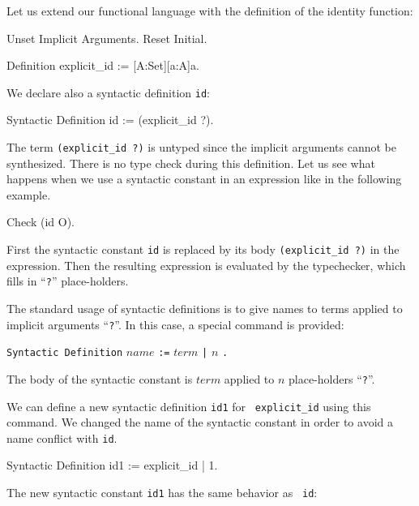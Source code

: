 {\begin{coq_example}
Let us extend our functional language with the definition of the
identity function:

\begin{coq_eval}
Unset Implicit Arguments.
Reset Initial.
\end{coq_eval}
\begin{coq_example}
Definition explicit_id := [A:Set][a:A]a.
\end{coq_example}

We declare also a syntactic definition {\tt id}:

\begin{coq_example}
Syntactic Definition id := (explicit_id ?).
\end{coq_example}

The term {\tt (explicit\_id ?)} is untyped since the implicit
arguments cannot be synthesized. There is no type check during this
definition.  Let us see what happens when we use a syntactic constant
in an expression like in the following example.

\begin{coq_example}
Check (id O).
\end{coq_example}

\noindent First the syntactic constant {\tt id} is replaced by its
body {\tt (explicit\_id ?)} in the expression. Then the resulting
expression is evaluated by the typechecker, which fills in
``\verb+?+'' place-holders.

The standard usage of syntactic definitions is to give names to terms
applied to implicit arguments ``\verb+?+''. In this case, a special
command is provided:

\begin{center}
\verb+Syntactic Definition+ $name$ \verb+:=+ $term$ \verb+|+ $n$ \verb+.+ \\
\end{center}

\noindent The body of the syntactic constant is $term$ applied to $n$
place-holders ``\verb+?+''.

We can define a new syntactic definition {\tt id1} for {\tt
  explicit\_id} using this command. We changed the name of the
syntactic constant in order to avoid a name conflict with {\tt id}.

\begin{coq_example}
Syntactic Definition id1 := explicit_id | 1.
\end{coq_example}

The new syntactic constant {\tt id1} has the same behavior as {\tt
  id}:


\end{coq_example}}
